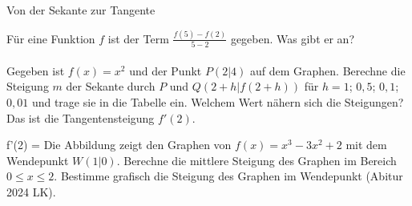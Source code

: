 \setcounter{aufgabe}{15}

\begin{aufgabe}{Von der Sekante zur Tangente}
\begin{teile}
\teil Für eine Funktion $f$ ist der Term $\frac{f(5) - f(2)}{5 - 2}$ gegeben. Was gibt er an? \\  \\ 
\teil Gegeben ist $f(x) = x^2$ und der Punkt $P(2 | 4)$ auf dem Graphen. Berechne die Steigung $m$ der Sekante durch $P$ und $Q(2 + h | f(2 + h))$ für $h = 1$; $0{,}5$; $0{,}1$; $0{,}01$ und trage sie in die Tabelle ein. Welchem Wert nähern sich die Steigungen? Das ist die Tangentensteigung $f'(2)$.

f'(2) = \leerfeld
\teil Die Abbildung zeigt den Graphen von $f(x) = x^3 - 3x^2 + 2$ mit dem Wendepunkt $W(1 | 0)$. Berechne die mittlere Steigung des Graphen im Bereich $0 \le x \le 2$. Bestimme grafisch die Steigung des Graphen im Wendepunkt \hfill (Abitur 2024 LK).


\end{teile}
\end{aufgabe}
